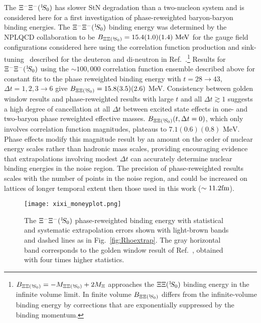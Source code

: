 The $\Xi^-\Xi^-(\si)$ has slower StN degradation than a two-nucleon system
and is considered here for a first investigation of phase-reweighted baryon-baryon binding energies.
The $\Xi^-\Xi^-(\si)$ binding energy was
determined 
by
the NPLQCD collaboration
to be
$B_{\Xi\Xi (\si)}= 15.4(1.0)(1.4)~{\rm MeV}$
for the gauge field configurations considered here
using the correlation function production and sink-tuning~\cite{Beane:2009kya,Beane:2009gs,Beane:2010em} described for the deuteron and di-neutron in Ref.~\cite{Orginos:2015aya}.\footnote{$B_{\Xi\Xi(\si)} = -M_{\Xi\Xi(\si)}+2M_\Xi$
approaches the $\Xi\Xi(\si)$ binding energy in the infinite volume limit.
In finite volume $B_{\Xi\Xi(\si)}$ differs from the infinite-volume binding energy
by corrections that are exponentially suppressed by the binding momentum.
}
Results for $\Xi^-\Xi^-(\si)$ using the $\sim 100,000$ correlation function ensemble described above 
for constant 
fits to the phase reweighted binding energy with $t = 28\rightarrow 43$, $\Delta t = 1,2,3\rightarrow 6$ 
give 
$B_{\Xi\Xi(\si)}=15.8(3.5)(2.6)$ MeV.
Consistency between golden window results and phase-reweighted results with large $t$ and all $\Delta t \gtrsim 1$
suggests
a high degree of cancellation at all $\Delta t$ between excited state effects in 
one- and two-baryon phase reweighted effective masses.
$B_{\Xi\Xi(\si)}(t, \Delta t = 0) $, which only involves correlation function magnitudes,
plateaus to $7.1(0.6)(0.8)\text{ MeV}$.
Phase effects modify this magnitude result
by an amount on the order of nuclear energy scales rather than hadronic mass scales,
providing encouraging evidence that extrapolations involving modest $\Delta t$ can accurately determine nuclear binding energies in the noise region.
The precision of phase-reweighted results scales with the number of points in the noise region,
and could be increased on lattices of longer temporal extent then those used in this work ($\sim 11.2 {\rm fm}$).



%
\begin{figure}[!t]
  \centering
	\texttt{[image: xixi\_moneyplot.png]}
		\caption{
	\label{fig:XiXiBindextrap} 
	The $\Xi^-\Xi^- (\si)$ phase-reweighted binding energy with statistical and systematic extrapolation errors shown
      with light-brown bands and dashed lines as in Fig.~\ref{fig:Rhoextrap}.
        The gray horizontal band corresponds to the golden window result of Ref.~\cite{Orginos:2015aya}, obtained with four times higher statistics.
	}		
\end{figure}
%

